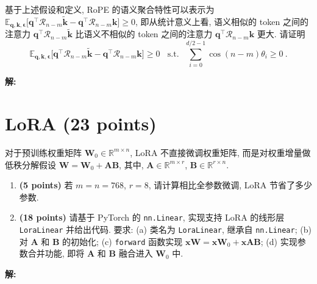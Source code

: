\documentclass[8pt]{article}
\newcommand{\points}[1]{\textbf{(#1 points)}}
\begin{document}
{\begin{enumerate}
\begin{enumerate}
    \end{enumerate}
    基于上述假设和定义, RoPE 的语义聚合特性可以表示为 $\mathbb{E}_{\mathbf{q}, \mathbf{k}, \boldsymbol{\epsilon}} 
    \big[
        \mathbf{q}^{\top} \boldsymbol{\mathcal{R}}_{n-m} \tilde{\mathbf{k}} 
        - 
        \mathbf{q}^{\top} \boldsymbol{\mathcal{R}}_{n-m} \mathbf{k}
    \big] \geq 0 $, 即从统计意义上看, 语义相似的 token 之间的注意力 $\mathbf{q}^{\top} \boldsymbol{\mathcal{R}}_{n-m} \tilde{\mathbf{k}} $ 比语义不相似的 token 之间的注意力 $\mathbf{q}^{\top} \boldsymbol{\mathcal{R}}_{n-m} \mathbf{k}$ 更大.
    请证明
    \begin{equation}
        \mathbb{E}_{\mathbf{q}, \mathbf{k}, \boldsymbol{\epsilon}} 
        \big[
        \mathbf{q}^{\top} \boldsymbol{\mathcal{R}}_{n-m} \tilde{\mathbf{k}} 
        - 
        \mathbf{q}^{\top} \boldsymbol{\mathcal{R}}_{n-m} \mathbf{k}
        \big] \geq 0 
        \ \ \ \  \text{s.t.} \ \ \ 
        \sum_{i=0}^{d/2-1} \cos (n-m)\theta_i \geq 0 \ .
    \end{equation} 
\end{enumerate}
}

\textbf{\large 解:}
\vspace{7em}

\section{LoRA \points{23}}

{\color{gray}
对于预训练权重矩阵 $\mathbf{W}_0\in\mathbb{R}^{m\times n}$, LoRA 不直接微调权重矩阵, 而是对权重增量做低秩分解假设 $\mathbf{W}=\mathbf{W}_0+\mathbf{A}\mathbf{B}$, 其中, $\mathbf{A}\in\mathbb{R}^{m\times r}$, $\mathbf{B}\in\mathbb{R}^{r \times n}$.
\begin{enumerate}
    \item \points{5} 若 $m=n=768$, $r=8$, 请计算相比全参数微调, LoRA 节省了多少参数. 
    \item \points{18} 请基于 PyTorch 的 \texttt{nn.Linear}, 实现支持 LoRA 的线形层 \texttt{LoraLinear} 并给出代码. 要求: (a) 类名为 \texttt{LoraLinear}, 继承自 \texttt{nn.Linear}; (b) 对 $\mathbf{A}$ 和 $\mathbf{B}$ 的初始化; (c) \texttt{forward} 函数实现 $\mathbf{x}\mathbf{W}=\mathbf{x}\mathbf{W}_0+\mathbf{x}\mathbf{A}\mathbf{B}$; (d) 实现参数合并功能, 即将 $\mathbf{A}$ 和 $\mathbf{B}$ 融合进入 $\mathbf{W}_0$ 中. 
\end{enumerate}
}

\textbf{\large 解:}
\vspace{8em}
\end{document}
